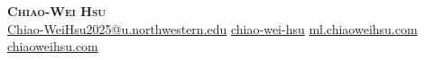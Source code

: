 
\begin{center}
  \textbf{\Huge \scshape Chiao-Wei Hsu} \\ 
  \vspace{5pt plus 2pt minus 2pt} \small \faPhone\hspace{1pt}  
  \hspace{10pt} \faEnvelope\hspace{2pt}\href{mailto:Chiao-WeiHsu2025@u.northwestern.edu} {Chiao-WeiHsu2025@u.northwestern.edu}
  \hspace{10pt} \faLinkedin\hspace{2pt}\href{https://linkedin.com/in/chiao-wei-hsu}{chiao-wei-hsu}
  \ifML
    \hspace{10pt} \faGlobe\hspace{2pt}\href{https://ml.chiaoweihsu.com}{ml.chiaoweihsu.com}
  \else
    \hspace{10pt} \faGlobe\hspace{2pt}\href{https://chiaoweihsu.com}{chiaoweihsu.com}
  \fi
\end{center}